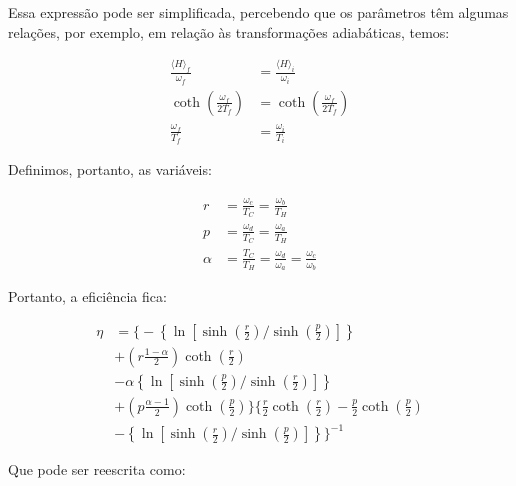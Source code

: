 Essa expressão pode ser simplificada, percebendo que os parâmetros têm algumas relações, por exemplo, em relação às transformações adiabáticas, temos:

\begin{equation}
\begin{split}
\frac{\langle H \rangle_f}{\omega_f} &= \frac{\langle H \rangle_i}{\omega_i} \\
\coth \left( \frac{\omega_f}{2T_f} \right) &= \coth \left( \frac{\omega_f}{2T_f} \right) \\
\frac{\omega_f}{T_f} &= \frac{\omega_i}{T_i}
\end{split}
\end{equation}

Definimos, portanto, as variáveis:

\begin{subequations}
\begin{align}
r &= \frac{\omega_c}{T_C} = \frac{\omega_b}{T_H} \\
p &= \frac{\omega_d}{T_C} = \frac{\omega_a}{T_H} \\
\alpha &= \frac{T_C}{T_H} = \frac{\omega_d}{\omega_a} = \frac{\omega_c}{\omega_b}
\end{align}
\label{rpalpha}
\end{subequations}

Portanto, a eficiência fica:

\begin{equation}
\begin{split}
\eta &= \Bigg\{- \left\{ \ln \left[ \sinh \left( \frac{r}{2} \right) \Big/ \sinh \left( \frac{p}{2} \right) \right] \right\} \\& + \left( r \frac{1 - \alpha }{2} \right) \coth \left( \frac{r}{2} \right) \\& - \alpha \left\{ \ln \left[ \sinh \left( \frac{p}{2} \right) \Big/ \sinh \left( \frac{r}{2} \right) \right] \right\} \\& + \left( p \frac{\alpha - 1}{2} \right) \coth \left( \frac{p}{2} \right) \Bigg\} \Bigg\{ \frac{r}{2} \coth \left( \frac{r}{2} \right) - \frac{p}{2} \coth \left( \frac{p}{2} \right) \\& - \left\{ \ln \left[ \sinh \left( \frac{r}{2} \right) \Big/ \sinh \left( \frac{p}{2} \right) \right] \right\} \Bigg\}^{-1}
\end{split}
\end{equation}

Que pode ser reescrita como:

